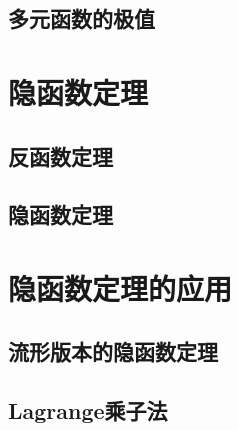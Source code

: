 \subsection{多元函数的极值}

\newpage
\section{隐函数定理}

\subsection{反函数定理}

\subsection{隐函数定理}


\newpage
\section{隐函数定理的应用}

\subsection{流形版本的隐函数定理}

\subsection{Lagrange乘子法}